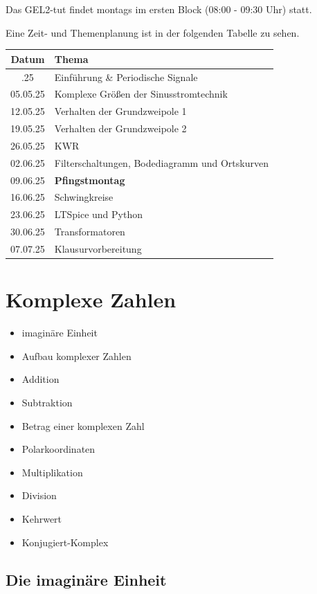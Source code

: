 \documentclass[
  ngerman,
  letterpaper,
]{scrbook}
\providecommand{\tightlist}{%
  \setlength{\itemsep}{0pt}\setlength{\parskip}{0pt}}
\begin{document}
Das GEL2-tut findet montags im ersten Block (08:00 - 09:30 Uhr) statt.

Eine Zeit- und Themenplanung ist in der folgenden Tabelle zu sehen.

\begin{longtable}[]{@{}cl@{}}
\toprule\noalign{}
Datum & Thema \\
\midrule\noalign{}
\endhead
\bottomrule\noalign{}
\endlastfoot
28.04.25 & Einführung \& Periodische Signale \\
05.05.25 & Komplexe Größen der Sinusstromtechnik \\
12.05.25 & Verhalten der Grundzweipole 1 \\
19.05.25 & Verhalten der Grundzweipole 2 \\
26.05.25 & KWR \\
02.06.25 & Filterschaltungen, Bodediagramm und Ortskurven \\
09.06.25 & \textbf{Pfingstmontag} \\
16.06.25 & Schwingkreise \\
23.06.25 & LTSpice und Python \\
30.06.25 & Transformatoren \\
07.07.25 & Klausurvorbereitung \\
\end{longtable}

\chapter{Komplexe Zahlen}\label{komplexe-zahlen}

\begin{itemize}
\tightlist
\item
  imaginäre Einheit
\item
  Aufbau komplexer Zahlen
\item
  Addition
\item
  Subtraktion
\item
  Betrag einer komplexen Zahl
\item
  Polarkoordinaten
\item
  Multiplikation
\item
  Division
\item
  Kehrwert
\item
  Konjugiert-Komplex
\end{itemize}

\section{Die imaginäre Einheit}\label{die-imaginuxe4re-einheit}
\end{document}
